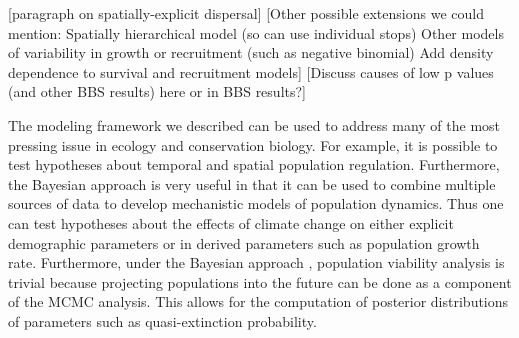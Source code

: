 \documentclass[12pt]{article}
\begin{document}
[paragraph on spatially-explicit dispersal]
 [Other possible extensions we could mention:
	Spatially hierarchical model (so can use individual stops)
	Other models of variability in growth or recruitment (such as negative binomial)
	Add density dependence to survival and recruitment models]
[Discuss causes of low p values (and other BBS results) here or in BBS
results?]

The modeling framework we described can be used to address many of the
most pressing issue in ecology and conservation biology. For example,
it is possible to test hypotheses about temporal and spatial
population regulation. Furthermore, the Bayesian approach is very
useful in that it can be used to combine multiple sources of data to
develop mechanistic models of population dynamics. Thus one can test
hypotheses about the effects of climate change on either explicit
demographic parameters or in derived parameters such as population
growth rate. Furthermore, under the Bayesian approach , population
viability analysis is trivial because projecting populations into the
future can be done as a component of the MCMC analysis. This allows
for the computation of posterior distributions of parameters such as
quasi-extinction probability.





\end{document}
